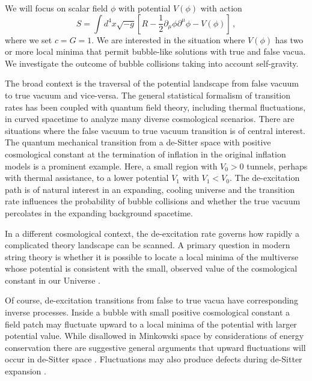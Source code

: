 \documentclass[preprintnumbers,eqsecnum,aps,prd,epsf,showpacs,nofootinbib
]{revtex4}
\begin{document}
We will focus on scalar field $\phi$ with potential $V(\phi)$ with
action
\begin{equation}
S=\int d^4 x \sqrt{-g} \left[R-\frac{1}{2} \partial_\mu \phi
 \partial^\mu \phi -V(\phi)\right]\,,
\end{equation}
where we set $c=G=1$. We are interested in the situation where
$V(\phi)$ has two or more local minima that permit bubble-like
solutions with true and false vacua. We investigate the outcome of
bubble collisions taking into account self-gravity.

The broad context is the traversal of the potential landscape from
false vacuum to true vacuum and vice-versa. The general statistical
formalism of transition rates \cite{Langer:1969bc} has been coupled
with quantum field theory, including thermal fluctuations, in curved
spacetime \cite{Coleman:1977py,Coleman:1980aw,Hawking:1982my} to
analyze many diverse cosmological scenarios. There are 
situations where the false vacuum to true vacuum transition is of
central interest. The quantum mechanical transition from a de-Sitter
space with positive cosmological constant 
at the termination of inflation in the original inflation models
\cite{Guth:1979bh,Kazanas:1980tx,Sato:1981ds,Guth:1980zm,Guth:1982pn}
is a prominent example. Here, a small region with $V_0>0$ tunnels,
perhaps with thermal assistance, to a lower potential $V_1$ with $V_1
< V_0$. The de-excitation path is of natural interest in an expanding,
cooling universe and the transition rate influences the probability of
bubble collisions and whether the true vacuum percolates in the
expanding background spacetime.

In a different cosmological context, the de-excitation rate governs
how rapidly a complicated theory landscape can be scanned. A primary
question in modern string theory is whether it is possible to locate a
local minima of the multiverse whose potential is consistent with the
small, observed value of the cosmological constant in our Universe
\cite{Polchinski:2006gy}.

Of course, de-excitation transitions from false to true vacua have
corresponding inverse processes. Inside a bubble with small positive
cosmological constant a field patch may fluctuate upward to a local
minima of the potential with larger potential value. While disallowed
in Minkowski space by considerations of energy conservation there are
suggestive general arguments that upward fluctuations will occur in
de-Sitter space \cite{Lee:1987qc}. Fluctuations may also produce
defects during de-Sitter expansion \cite{Basu:1991ig}.
\end{document}
